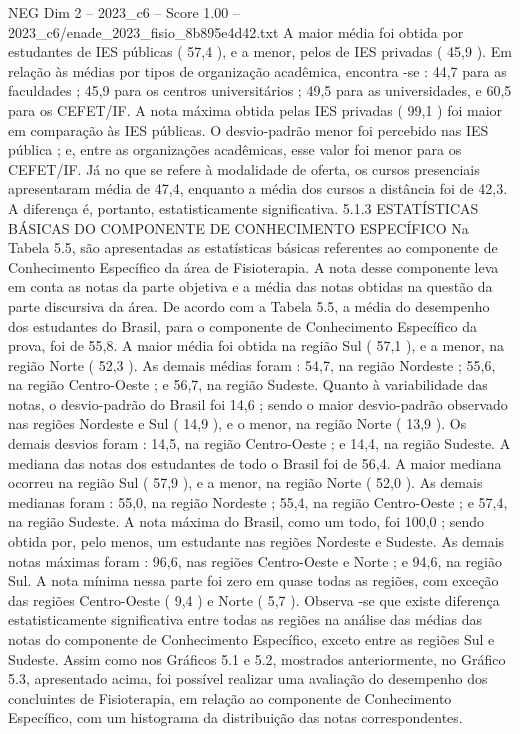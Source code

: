 \begin{textsample}{NEG Dim 2 – 2023\_c6 – Score 1.00 – 2023\_c6/enade\_2023\_fisio\_8b895e4d42.txt}
A maior média foi obtida por estudantes de IES públicas ( 57,4 ), e a menor, pelos de IES privadas ( 45,9 ).
Em relação às médias por tipos de organização acadêmica, encontra -se : 44,7 para as faculdades ; 45,9 para os centros universitários ; 49,5 para as universidades, e 60,5 para os CEFET/IF.
A nota máxima obtida pelas IES privadas ( 99,1 ) foi maior em comparação às IES públicas.
O desvio-padrão menor foi percebido nas IES pública ; e, entre as organizações acadêmicas, esse valor foi menor para os CEFET/IF.
Já no que se refere à modalidade de oferta, os cursos presenciais apresentaram média de 47,4, enquanto a média dos cursos a distância foi de 42,3.
A diferença é, portanto, estatisticamente significativa. 5.1.3 ESTATÍSTICAS BÁSICAS DO COMPONENTE DE CONHECIMENTO ESPECÍFICO Na Tabela 5.5, são apresentadas as estatísticas básicas referentes ao componente de Conhecimento Específico da área de Fisioterapia.
A nota desse componente leva em conta as notas da parte objetiva e a média das notas obtidas na questão da parte discursiva da área.
De acordo com a Tabela 5.5, a média do desempenho dos estudantes do Brasil, para o componente de Conhecimento Específico da prova, foi de 55,8.
A maior média foi obtida na região Sul ( 57,1 ), e a menor, na região Norte ( 52,3 ).
As demais médias foram : 54,7, na região Nordeste ; 55,6, na região Centro-Oeste ; e 56,7, na região Sudeste.
Quanto à variabilidade das notas, o desvio-padrão do Brasil foi 14,6 ; sendo o maior desvio-padrão observado nas regiões Nordeste e Sul ( 14,9 ), e o menor, na região Norte ( 13,9 ).
Os demais desvios foram : 14,5, na região Centro-Oeste ; e 14,4, na região Sudeste.
A mediana das notas dos estudantes de todo o Brasil foi de 56,4.
A maior mediana ocorreu na região Sul ( 57,9 ), e a menor, na região Norte ( 52,0 ).
As demais medianas foram : 55,0, na região Nordeste ; 55,4, na região Centro-Oeste ; e 57,4, na região Sudeste.
A nota máxima do Brasil, como um todo, foi 100,0 ; sendo obtida por, pelo menos, um estudante nas regiões Nordeste e Sudeste.
As demais notas máximas foram : 96,6, nas regiões Centro-Oeste e Norte ; e 94,6, na região Sul.
A nota mínima nessa parte foi zero em quase todas as regiões, com exceção das regiões Centro-Oeste ( 9,4 ) e Norte ( 5,7 ).
Observa -se que existe diferença estatisticamente significativa entre todas as regiões na análise das médias das notas do componente de Conhecimento Específico, exceto entre as regiões Sul e Sudeste.
Assim como nos Gráficos 5.1 e 5.2, mostrados anteriormente, no Gráfico 5.3, apresentado acima, foi possível realizar uma avaliação do desempenho dos concluintes de Fisioterapia, em relação ao componente de Conhecimento Específico, com um histograma da distribuição das notas correspondentes.

\end{textsample}
